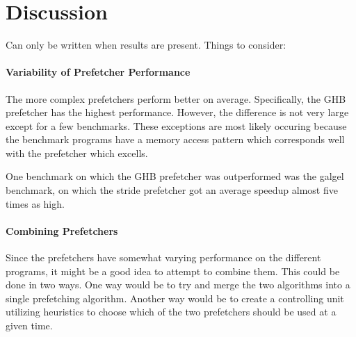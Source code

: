 
\section{Discussion} %
\label{sec:discussion}

Can only be written when results are present.
Things to consider:

\paragraph{Variability of Prefetcher Performance}
\label{par:varprefperf}

The more complex prefetchers perform better on average. Specifically, the GHB
prefetcher has the highest performance. However, the difference is not
very large except for a few benchmarks. These exceptions are most
likely occuring because the benchmark programs have a memory access pattern
which corresponds well with the prefetcher which excells.


One benchmark on which the GHB prefetcher was outperformed was the
galgel benchmark, on which the stride prefetcher got an average
speedup almost five times as high. 





\paragraph{Combining Prefetchers}
\label{par:prefcombo}
Since the prefetchers have somewhat varying performance on the
different programs, it might be a good idea to attempt to combine
them. This could be done in two ways. One way would be to try and
merge the two algorithms into a single prefetching algorithm. Another
way would be to create a controlling unit utilizing heuristics to
choose which of the two prefetchers should be used at a given time.

